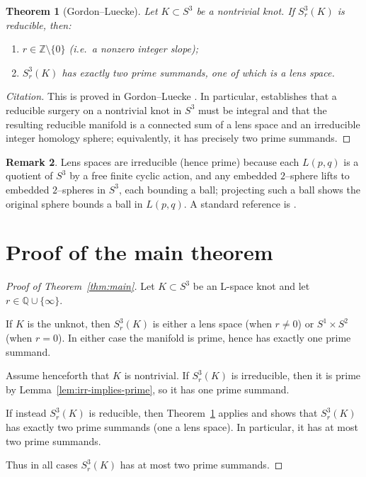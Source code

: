 \documentclass[11pt]{article}
\newtheorem{theorem}{Theorem}[section]
\theoremstyle{definition}
\newtheorem{remark}[theorem]{Remark}
\begin{document}
\begin{theorem}[Gordon--Luecke]\label{thm:GL}
Let $K\subset S^3$ be a nontrivial knot. If $S^3_r(K)$ is reducible, then:
\begin{enumerate}
\item $r\in\mathbb{Z}\setminus\{0\}$ (i.e.\ a nonzero integer slope);
\item $S^3_r(K)$ has \emph{exactly two} prime summands, one of which is a lens space.
\end{enumerate}
\end{theorem}

\begin{proof}[Citation]
This is proved in Gordon--Luecke \cite{GL96}. In particular, \cite{GL96} establishes that a reducible surgery on a nontrivial knot in $S^3$ must be integral and that the resulting reducible manifold is a connected sum of a lens space and an irreducible integer homology sphere; equivalently, it has precisely two prime summands.
\end{proof}

\begin{remark}\label{rem:lens-prime}
Lens spaces are irreducible (hence prime) because each $L(p,q)$ is a quotient of $S^3$ by a free finite cyclic action, and any embedded $2$--sphere lifts to embedded $2$--spheres in $S^3$, each bounding a ball; projecting such a ball shows the original sphere bounds a ball in $L(p,q)$. A standard reference is \cite[Chapter~3]{Hempel}.
\end{remark}

\section{Proof of the main theorem}

\begin{proof}[Proof of Theorem~\ref{thm:main}]
Let $K\subset S^3$ be an L-space knot and let $r\in\mathbb{Q}\cup\{\infty\}$.

If $K$ is the unknot, then $S^3_r(K)$ is either a lens space (when $r\neq 0$) or $S^1\times S^2$ (when $r=0$). In either case the manifold is prime, hence has exactly one prime summand.

Assume henceforth that $K$ is nontrivial. If $S^3_r(K)$ is irreducible, then it is prime by Lemma~\ref{lem:irr-implies-prime}, so it has one prime summand.

If instead $S^3_r(K)$ is reducible, then Theorem~\ref{thm:GL} applies and shows that $S^3_r(K)$ has exactly two prime summands (one a lens space). In particular, it has at most two prime summands.

Thus in all cases $S^3_r(K)$ has at most two prime summands.
\end{proof}
\end{document}
